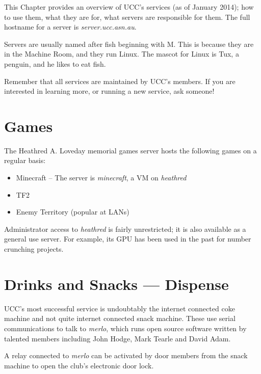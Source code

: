 
\newcommand{\server}[1]{\emph{#1}}

\null
This Chapter provides an overview of UCC's services (as of January 2014); how to use them, what they are for, what servers are responsible for them. The full hostname for a server is \server{server.ucc.asn.au}.

 Servers are usually named after fish beginning with M. This is because they are in the Machine Room, and they run Linux. The mascot for Linux is Tux, a penguin, and he likes to eat fish.


Remember that all services are maintained by UCC's members. If you are interested in learning more, or running a new service, ask someone!



\newenvironment{uccservice}[2]
{
	\begin{minipage}{\textwidth}
	\section{#1}
}{
\end{minipage}
}

\begin{uccservice}{Games}{heathred}
The Heathred A. Loveday memorial games server hosts the following games on a regular basis:
\begin{itemize}
	\item Minecraft -- The server is \server{minecraft}, a VM on \server{heathred}
	\item TF2
	\item Enemy Territory (popular at LANs)
\end{itemize}

Administrator access to \server{heathred} is fairly unrestricted; it is also available as a general use server. For example, its GPU has been used in the past for number crunching projects.
\end{uccservice}

\begin{uccservice}{Drinks and Snacks --- Dispense}{merlo, coke machine, snack machine}
UCC's most successful service is undoubtably the internet connected coke machine and not quite internet connected snack machine. These use serial communications to talk to \server{merlo}, which runs open source software written by talented members including John Hodge, Mark Tearle and David Adam. 

A relay connected to \server{merlo} can be activated by door members from the snack machine to open the club's electronic door lock.
\end{uccservice}

